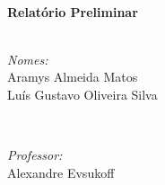 \begin{titlepage}

\HRule 
\\[0.8cm]
{ \huge \bfseries  Relatório Preliminar }\\[0.4cm] %
\HRule \\[1.5cm]
 

\begin{minipage}{0.4\textwidth}
\begin{flushleft} \large
\emph{Nomes:}\\
Aramys Almeida Matos \\
Luís Gustavo Oliveira Silva 
\end{flushleft}
\end{minipage}
~
\begin{minipage}{0.4\textwidth}
\begin{flushright} \large
\emph{Professor:} \\
Alexandre Evsukoff  %
\end{flushright}
\end{minipage}\\[4cm]



\vspace*{\fill}
\end{titlepage}